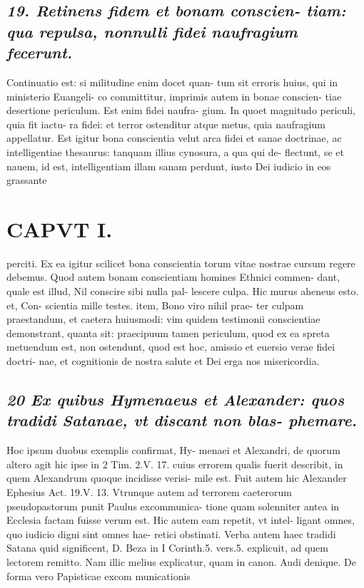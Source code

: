 \documentclass{article}
\begin{document}
\begin{pages}
\subsection*{\textit{19. Retinens fidem et bonam conscien- tiam: qua repulsa, nonnulli fidei naufragium fecerunt. }}\pstart Continuatio est: si militudine enim docet quan- tum sit erroris huius, qui in ministerio Euangeli- co committitur, imprimis autem in bonae conscien- tiae desertione periculum. Est enim fidei naufra- gium. In quoet magnitudo periculi, quia fit iactu- ra fidei: et terror ostenditur atque metus, quia naufragium appellatur. Est igitur bona conscientia velut arca fidei et sanae doctrinae, ac intelligentiae thesaurus: tanquam illius cynosura, a qua qui de- flectunt, se et nauem, id est, intelligentiam illam sanam perdunt, iusto Dei iudicio in eos grassante  \pend
\section*{CAPVT I. }
\marginpar{[ p.37 ]}\pstart perciti. Ex ea igitur scilicet bona conscientia torum vitae nostrae cursum regere debemus. Quod autem bonam conscientiam homines Ethnici commen- dant, quale est illud, Nil conscire sibi nulla pal- lescere culpa. Hic murus aheneus esto. et, Con- scientia mille testes. item, Bono viro nihil prae- ter culpam praestandum, et caetera huiusmodi: vim quidem testimonii conscientiae demonstrant, quanta sit: praecipuum tamen periculum, quod ex ea spreta metuendum est, non ostendunt, quod est hoc, amissio et euersio verae fidei doctri- nae, et cognitionis de nostra salute et Dei erga nos misericordia.  \pend
{}
{}
\subsection*{\textit{20 Ex quibus Hymenaeus et Alexander: quos tradidi Satanae, vt discant non blas- phemare. }}\pstart Hoc ipsum duobus exemplis confirmat, Hy- menaei et Alexandri, de quorum altero agit hic ipse in 2 Tim. 2.V. 17. cuius errorem qualis fuerit describit, in quem Alexandrum quoque  incidisse verisi- mile est. Fuit autem hic Alexander Ephesius Act. 19.V. 13. Vtrunque autem ad terrorem caeterorum pseudopastorum punit Paulus excommunica- tione quam solenniter antea in Ecclesia factam fuisse verum est. Hic autem eam repetit, vt intel- ligant omnes, quo iudicio digni sint omnes hae- retici obstinati. Verba autem haec tradidi Satana quid significent, D. Beza in I Corinth.5. vers.5. explicuit, ad quem lectorem remitto. Nam illic melius explicatur, quam in canon. Audi denique. De forma vero Papisticae excom municationis  \pend

\end{pages}
\end{document}

